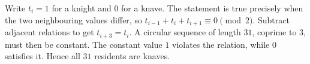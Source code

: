 Write $t_i=1$ for a knight and $0$ for a knave. The statement is true precisely when the two neighbouring values differ, so $t_{i-1}+t_i+t_{i+1}\equiv0\pmod2$. Subtract adjacent relations to get $t_{i+3}=t_i$. A circular sequence of length $31$, coprime to $3$, must then be constant. The constant value $1$ violates the relation, while $0$ satisfies it. Hence all $\boxed{31}$ residents are knaves.
